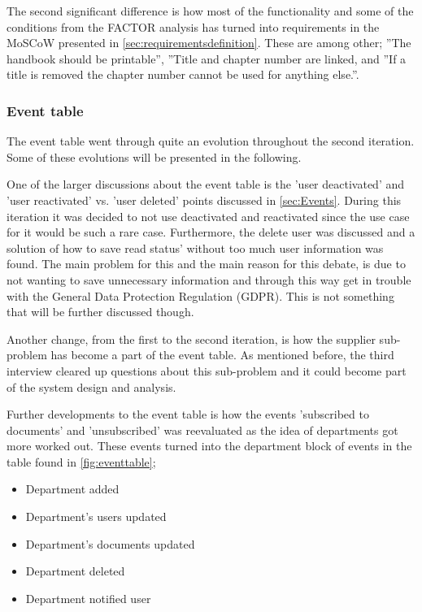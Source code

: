 The second significant difference is how most of the functionality and some of the conditions from the FACTOR analysis has turned into requirements in the MoSCoW presented in \cref{sec:requirementsdefinition}. 
These are among other; ''The handbook should be printable'', ''Title and chapter number are linked, and ''If a title is removed the chapter number cannot be used for anything else.''.

\subsubsection*{Event table}
The event table went through quite an evolution throughout the second iteration.
Some of these evolutions will be presented in the following.

One of the larger discussions about the event table is the 'user deactivated' and 'user reactivated' vs. 'user deleted' points discussed in \cref{sec:Events}.
During this iteration it was decided to not use deactivated and reactivated since the use case for it would be such a rare case.
Furthermore, the delete user was discussed and a solution of how to save read status' without too much user information was found.
The main problem for this and the main reason for this debate, is due to not wanting to save unnecessary information and through this way get in trouble with the General Data Protection Regulation (GDPR).
This is not something that will be further discussed though.

Another change, from the first to the second iteration, is how the supplier sub-problem has become a part of the event table.
As mentioned before, the third interview cleared up questions about this sub-problem and it could become part of the system design and analysis.

Further developments to the event table is how the events 'subscribed to documents' and 'unsubscribed' was reevaluated as the idea of departments got more worked out.
These events turned into the department block of events in the table found in \cref{fig:eventtable};
\begin{itemize}
	\item 
	Department added
	\item
	Department's users updated
	\item
	Department's documents updated
	\item
	Department deleted
	\item
	Department notified user
\end{itemize} 

